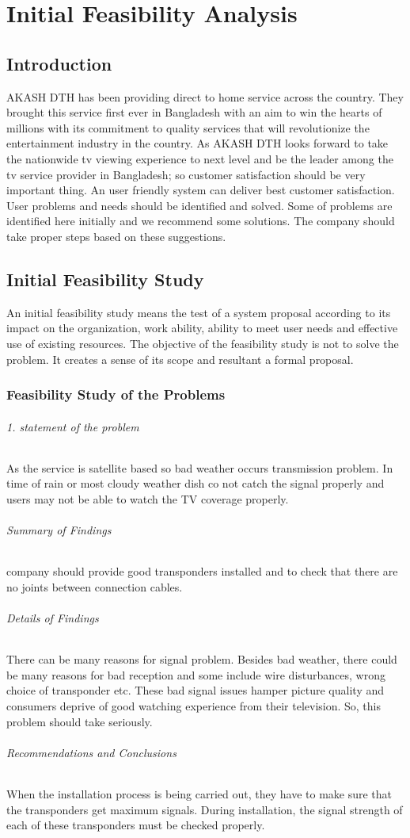 \chapter{Initial Feasibility Analysis}
\begin{spacing}{1.0}
\setlength{\parskip}{0.2in}
\graphicspath{{./Chapter2/}}

\section{Introduction}
AKASH DTH has been providing direct to home service across the country. They brought this service first ever in Bangladesh with an aim to win the hearts of millions with its commitment to quality services that will revolutionize the entertainment industry in the country.
\newline
As AKASH DTH looks forward to take the nationwide tv viewing experience to next level and be the leader among the tv service provider in Bangladesh; so customer satisfaction should be very important thing. An user friendly system can deliver best customer satisfaction. User problems and needs should be identified and solved. Some of problems are identified here initially and we recommend some solutions. The company should take proper steps based on these suggestions.

\section{Initial Feasibility Study}
An initial feasibility study means the test of a system proposal according to its impact on the organization, work ability, ability to meet user needs and effective use of existing resources. The objective of the feasibility study is not to solve the problem. It creates a sense of its scope and resultant a formal proposal.
\subsection{Feasibility Study of the Problems}
\subparagraph{1. statement of the problem}
As the service is satellite based so bad weather occurs transmission problem. In time of rain or most cloudy weather dish co not catch the signal properly and users may not be able to watch the TV coverage properly.
\subparagraph{Summary of Findings}
company should provide good transponders installed and to check that there are no joints between connection cables.
\subparagraph{Details of Findings}
There can be many reasons for signal problem. Besides bad weather, there could be many reasons for bad reception and some include wire disturbances, wrong choice of transponder etc. These bad signal issues hamper picture quality and consumers deprive of good watching experience from their television. So, this problem should take seriously.
\subparagraph{Recommendations and Conclusions}
When the installation process is being carried out, they have to make sure that the transponders get maximum signals. During installation, the signal strength of each of these transponders must be checked properly.


\end{spacing}
